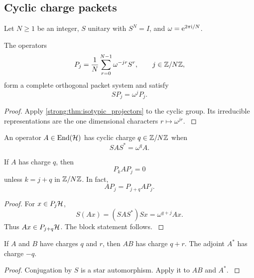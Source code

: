 \subsection{Cyclic charge packets}\label{strong:subsec:cyclic_charge}

Let \(N\ge1\) be an integer, \(S\) unitary with \(S^N=I\), and \(\omega=\e^{2\pi\ii/N}\).

\begin{corollary}\label{strong:corollary:002}\label{strong:cor:cyclic_projectors}
The operators
\[
P_j
=
\frac1N
\sum_{r=0}^{N-1}
\omega^{-jr}S^r,
\qquad
j\in\ZZ/N\ZZ,
\]
form a complete orthogonal packet system and satisfy
\[
SP_j=\omega^jP_j.
\]
\end{corollary}

\begin{proof}\label{strong:proof:007}
Apply \cref{strong:thm:isotypic_projectors} to the cyclic group. Its irreducible representations are the one dimensional characters \(r\mapsto\omega^{jr}\).
\label{strong:proof:007:end}\end{proof}

\begin{definition}\label{strong:definition:002}\label{strong:def:operator_charge}
An operator \(A\in\End(\Hcal)\) has cyclic charge \(q\in\ZZ/N\ZZ\) when
\[
SAS^*=\omega^qA.
\]
\end{definition}

\begin{theorem}\label{strong:theorem:005}\label{strong:thm:charge_selection}
If \(A\) has charge \(q\), then
\[
P_kAP_j=0
\]
unless \(k=j+q\) in \(\ZZ/N\ZZ\). In fact,
\[
AP_j=P_{j+q}AP_j.
\]
\end{theorem}

\begin{proof}\label{strong:proof:008}
For \(x\in P_j\Hcal\),
\[
S(Ax)
=(SAS^*)Sx
=\omega^{q+j}Ax.
\]
Thus \(Ax\in P_{j+q}\Hcal\). The block statement follows.
\label{strong:proof:008:end}\end{proof}

\begin{corollary}\label{strong:corollary:003}\label{strong:cor:charge_addition}
If \(A\) and \(B\) have charges \(q\) and \(r\), then \(AB\) has charge \(q+r\). The adjoint \(A^*\) has charge \(-q\).
\end{corollary}

\begin{proof}\label{strong:proof:009}
Conjugation by \(S\) is a star automorphism. Apply it to \(AB\) and \(A^*\).
\label{strong:proof:009:end}\end{proof}

